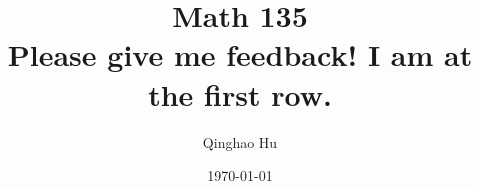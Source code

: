 \documentclass[10pt, twoside]{article}
\title{\textbf{Math 135}\\[0.5em]\large Please give me feedback! I am at the first row. }
\author{Qinghao Hu}
\date{\today}
\begin{document}
\raggedbottom

\maketitle
\clearpage
\begingroup
\small
\tableofcontents
\endgroup








\end{document}
